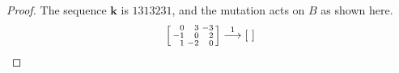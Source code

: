 \documentclass[10pt]{article}
\theoremstyle{definition}
\theoremstyle{remark}
\numberwithin{equation}{section}
\newcommand{\0}{{\mathbf{0}}}
\newcommand{\kk}{{\boldsymbol{k}}}
\begin{document}
\begin{proof}
The sequence $\kk$ is $1313231$, and the mutation acts on $B$ as shown here.
\begin{multline*}
\begin{bsmallmatrix*}[r]
0&3&-3\\
-1&0&2\\
1&-2&0
\end{bsmallmatrix*}
\overset{1}{\longrightarrow}
\begin{bsmallmatrix*}[r]

\end{bsmallmatrix*}
\end{multline*}
\end{proof}
\end{document}
